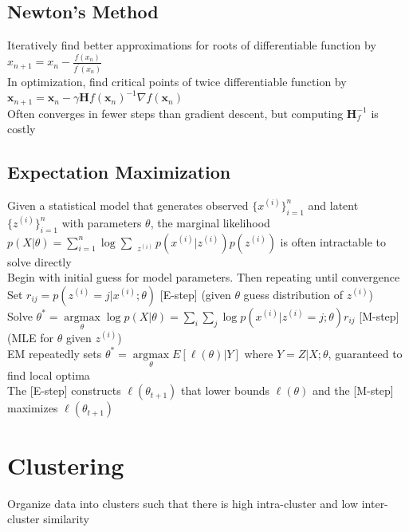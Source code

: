 \documentclass{article}
\DeclareMathOperator*{\argmax}{argmax}
\begin{document}
\subsection{Newton's Method}
Iteratively find better approximations for roots of differentiable function by $x_{n+1} = x_n - \frac{f(x_n)}{f^\prime(x_n)}$ \\
In optimization, find critical points of twice differentiable function by $\boldsymbol{x}_{n+1} = \boldsymbol{x}_n - \gamma \boldsymbol{H}f(\boldsymbol{x}_n)^{-1} \nabla f(\boldsymbol{x}_n) $ \\
Often converges in fewer steps than gradient descent, but computing $\boldsymbol{H}_f^{-1}$ is costly 

\subsection{Expectation Maximization}

Given a statistical model that generates observed $\{x^{(i)}\}_{i=1}^n$ and latent $\{z^{(i)}\}_{i=1}^n$ with parameters $\theta$, the marginal likelihood $p(X | \theta) = \sum\limits_{i=1}^n\log\sum\limits_{\mbox{ }z^{(i)}} p(x^{(i)}| z^{(i)})p(z^{(i)})$ is often intractable to solve directly \\
Begin with initial guess for model parameters. Then repeating until convergence \\
Set $r_{ij} = p(z^{(i)} = j | x^{(i)}; \theta)$ [E-step] (given $\theta$ guess distribution of $z^{(i)}$) \\
Solve $\theta^* = \argmax\limits_\theta \log p(X|\theta) =  \sum_{i}\sum_{j} \log p(x^{(i)} | z^{(i)} = j; \theta)r_{ij} $ [M-step] (MLE for $\theta$ given $z^{(i)}$) \\
EM repeatedly sets $\theta^* = \argmax\limits_\theta E[\ell(\theta) | Y]$ where $Y = Z|X; \theta$, guaranteed to find local optima \\
The [E-step] constructs $\ell(\theta_{t+1})$ that lower bounds $\ell(\theta)$ and the [M-step] maximizes $\ell(\theta_{t+1})$

\newpage
\section{Clustering}
Organize data into clusters such that there is high intra-cluster and low inter-cluster similarity 
\end{document}
